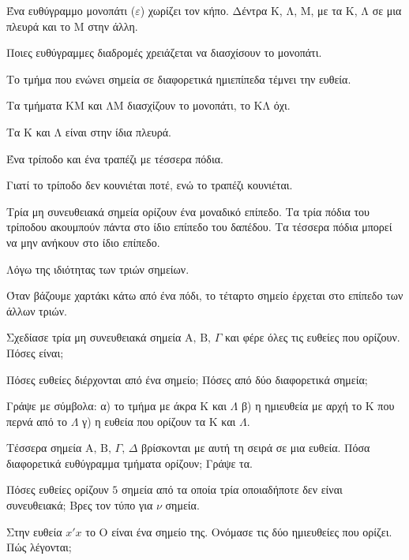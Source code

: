 \tixero Ένα ευθύγραμμο μονοπάτι ($\varepsilon$) χωρίζει τον κήπο. Δέντρα $\mathrm{Κ}$, $\mathrm{Λ}$, $\mathrm{Μ}$, με τα $\mathrm{Κ}$, $\mathrm{Λ}$ σε μια πλευρά και το $\mathrm{Μ}$ στην άλλη.\par
\tithelo Ποιες ευθύγραμμες διαδρομές χρειάζεται να διασχίσουν το μονοπάτι.\par
\possindeo Το τμήμα που ενώνει σημεία σε διαφορετικά ημιεπίπεδα τέμνει την ευθεία.\par
\apantisi Τα τμήματα $\mathrm{ΚΜ}$ και $\mathrm{ΛΜ}$ διασχίζουν το μονοπάτι, το $\mathrm{ΚΛ}$ όχι.\par
\elegxos Τα $\mathrm{Κ}$ και $\mathrm{Λ}$ είναι στην ίδια πλευρά.

\tixero Ένα τρίποδο και ένα τραπέζι με τέσσερα πόδια.\par
\tithelo Γιατί το τρίποδο δεν κουνιέται ποτέ, ενώ το τραπέζι κουνιέται.\par
\possindeo Τρία μη συνευθειακά σημεία ορίζουν ένα μοναδικό επίπεδο. Τα τρία πόδια του τρίποδου ακουμπούν πάντα στο ίδιο επίπεδο του δαπέδου. Τα τέσσερα πόδια μπορεί να μην ανήκουν στο ίδιο επίπεδο.\par
\apantisi Λόγω της ιδιότητας των τριών σημείων.\par
\elegxos Όταν βάζουμε χαρτάκι κάτω από ένα πόδι, το τέταρτο σημείο έρχεται στο επίπεδο των άλλων τριών.



\ex Σχεδίασε τρία μη συνευθειακά σημεία $\mathrm{Α},\,\mathrm{Β},\,\Gamma$ και φέρε όλες τις ευθείες που ορίζουν. Πόσες είναι;

\ex Πόσες ευθείες διέρχονται από ένα σημείο; Πόσες από δύο διαφορετικά σημεία;

\ex Γράψε με σύμβολα: α) το τμήμα με άκρα $\mathrm{Κ}$ και $\Lambda$ \quad β) η ημιευθεία με αρχή το $\mathrm{Κ}$ που περνά από το $\Lambda$ \quad γ) η ευθεία που ορίζουν τα $\mathrm{Κ}$ και $\Lambda$.

\ex Τέσσερα σημεία $\mathrm{Α},\,\mathrm{Β},\,\Gamma,\,\Delta$ βρίσκονται με αυτή τη σειρά σε μια ευθεία. Πόσα διαφορετικά ευθύγραμμα τμήματα ορίζουν; Γράψε τα.

\ex Πόσες ευθείες ορίζουν $5$ σημεία από τα οποία τρία οποιαδήποτε δεν είναι συνευθειακά; Βρες τον τύπο για $\nu$ σημεία.

\ex Στην ευθεία $x'x$ το $\mathrm{Ο}$ είναι ένα σημείο της. Ονόμασε τις δύο ημιευθείες που ορίζει. Πώς λέγονται;

